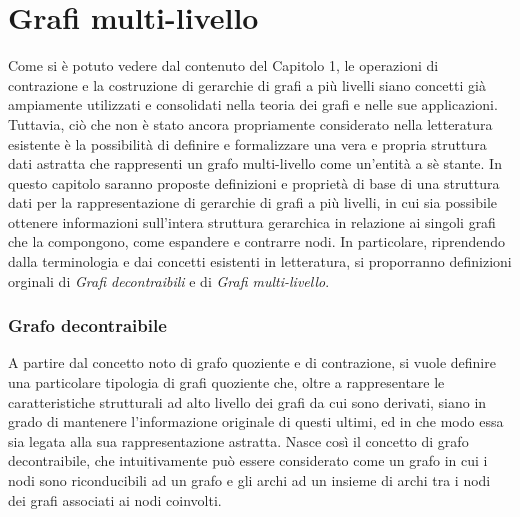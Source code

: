 \chapter{Grafi multi-livello}

Come si \`e potuto vedere dal contenuto del Capitolo 1, le operazioni di contrazione e la costruzione di
gerarchie di grafi a pi\`u livelli siano concetti gi\`a ampiamente utilizzati e consolidati nella teoria dei grafi e
nelle sue applicazioni.
Tuttavia, ci\`o che non \`e stato ancora propriamente considerato nella letteratura esistente \`e la possibilit\`a di
definire e formalizzare una vera e propria struttura dati astratta che rappresenti un grafo multi-livello come
un'entit\`a a s\`e stante.
In questo capitolo saranno proposte definizioni e propriet\`a di base di una struttura dati per la rappresentazione
di gerarchie di grafi a pi\`u livelli, in cui sia possibile ottenere informazioni sull'intera struttura gerarchica in
relazione ai singoli grafi che la compongono, come espandere e contrarre nodi.
In particolare, riprendendo dalla terminologia e dai concetti esistenti in letteratura, si proporranno definizioni
orginali di \textit{Grafi decontraibili} e di \textit{Grafi multi-livello}.

\subsection{Grafo decontraibile}\label{subsec:grafo-decontraibile}

    A partire dal concetto noto di grafo quoziente e di contrazione, si vuole definire una particolare
    tipologia di grafi quoziente che, oltre a rappresentare le caratteristiche strutturali ad alto livello
    dei grafi da cui sono derivati, siano in grado di mantenere l'informazione originale di questi ultimi, ed in
    che modo essa sia legata alla sua rappresentazione astratta. \newline
    Nasce cos\`i il concetto di grafo decontraibile, che intuitivamente pu\`o essere considerato come un grafo
    in cui i nodi sono riconducibili ad un grafo e gli archi ad un insieme di archi tra i nodi dei grafi
    associati ai nodi coinvolti. \newline

